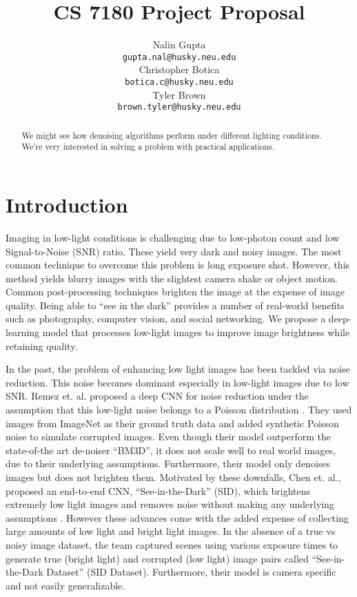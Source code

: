 \documentclass{article}
\title{CS 7180 Project Proposal}
\author{%
  Nalin Gupta \\
  \texttt{gupta.nal@husky.neu.edu} \\
  \And
  Christopher Botica\\
  \texttt{botica.c@husky.neu.edu} \\
  \And
  Tyler Brown\\
  \texttt{brown.tyler@husky.neu.edu} \\
}
\begin{document}

\maketitle

\begin{abstract}
  We might see how denoising algorithms perform under different lighting
  conditions. We're very interested in solving a problem with practical
  applications. 
\end{abstract}

\section{Introduction}

Imaging in low-light conditions is challenging due to low-photon count
and low Signal-to-Noise (SNR) ratio. These yield very dark and noisy images.
The most common technique to overcome this problem is long exposure shot.
However, this method yields blurry images with the slightest camera shake
or object motion. Common post-processing techniques brighten the image at
the expense of image quality. Being able to “see in the dark” provides a
number of real-world benefits such as photography, computer vision, and
social networking. We propose a deep-learning model that processes low-light
images to improve image brightness while retaining quality.


In the past, the problem of enhancing low light images has been tackled via
noise reduction. This noise becomes dominant especially in low-light images
due to low SNR. Remez et. al. proposed a deep CNN for noise reduction under
the assumption that this low-light noise belongs to a Poisson
distribution \cite{remez2017deep}.  They used images from ImageNet as their ground truth data
and added synthetic Poisson noise to simulate corrupted images. Even though
their model outperform the state-of-the art de-noiser “BM3D”, it does not
scale well to real world images, due to their underlying assumptions.
Furthermore, their model only denoises images but does not brighten them.
Motivated by these downfalls, Chen et. al., proposed an end-to-end CNN,
“See-in-the-Dark” (SID), which brightens extremely low light images and
removes noise without making any underlying assumptions
\cite{chen2018learning}. However these advances come with the added expense
of collecting large amounts of low
light and bright light images. In the absence of a true vs noisy image
dataset, the team captured scenes using various exposure times to generate
true (bright light) and corrupted (low light) image pairs called
“See-in-the-Dark Dataset” (SID Dataset). Furthermore, their model is camera
specific and not easily generalizable.
\end{document}
